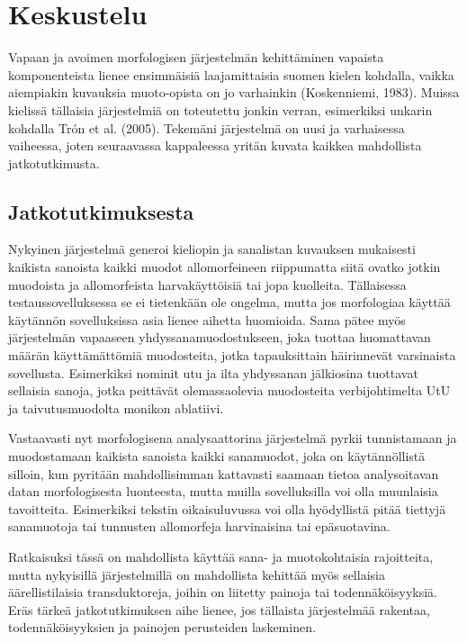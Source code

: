 \documentclass[free]{flammie}
\begin{document}
\section{Keskustelu}

Vapaan ja avoimen morfologisen järjestelmän kehittäminen vapaista komponenteista lienee ensimmäisiä laajamittaisia suomen kielen kohdalla, vaikka aiempiakin kuvauksia muoto-opista on jo varhainkin (Koskenniemi, 1983). Muissa kielissä tällaisia järjestelmiä on toteutettu jonkin verran, esimerkiksi unkarin kohdalla
Trón et al. (2005). Tekemäni järjestelmä on uusi ja varhaisessa vaiheessa, joten
seuraavassa kappaleessa yritän kuvata kaikkea mahdollista jatkotutkimusta.

\subsection{Jatkotutkimuksesta}

Nykyinen järjestelmä generoi kieliopin ja sanalistan kuvauksen mukaisesti kaikista sanoista kaikki muodot allomorfeineen riippumatta siitä ovatko jotkin muodoista ja allomorfeista harvakäyttöisiä tai jopa kuolleita. Tällaisessa testaussovelluksessa se ei tietenkään ole ongelma, mutta jos morfologiaa käyttää käytännön
sovelluksissa asia lienee aihetta huomioida. Sama pätee myös järjestelmän vapaaseen yhdyssanamuodostukseen, joka tuottaa huomattavan määrän käyttämättömiä muodosteita, jotka tapauksittain häirinnevät varsinaista sovellusta. Esimerkiksi nominit utu ja ilta yhdyssanan jälkiosina tuottavat sellaisia sanoja, jotka peittävät olemassaolevia muodosteita verbijohtimelta UtU ja taivutusmuodolta monikon ablatiivi.

Vastaavasti nyt morfologisena analysaattorina järjestelmä pyrkii tunnistamaan ja
muodostamaan kaikista sanoista kaikki sanamuodot, joka on käytännöllistä silloin, kun pyritään mahdollisimman kattavasti saamaan tietoa analysoitavan datan
morfologisesta luonteesta, mutta muilla sovelluksilla voi olla muunlaisia tavoitteita. Esimerkiksi tekstin oikaisuluvussa voi olla hyödyllistä pitää tiettyjä sanamuotoja tai tunnusten allomorfeja harvinaisina tai epäsuotavina.

Ratkaisuksi tässä on mahdollista käyttää sana- ja muotokohtaisia rajoitteita, mutta nykyisillä järjestelmillä on mahdollista kehittää myös sellaisia äärellistilaisia
transduktoreja, joihin on liitetty painoja tai todennäköisyyksiä. Eräs tärkeä jatkotutkimuksen aihe lienee, jos tällaista järjestelmää rakentaa, todennäköisyyksien ja
painojen perusteiden laskeminen.
\end{document}
